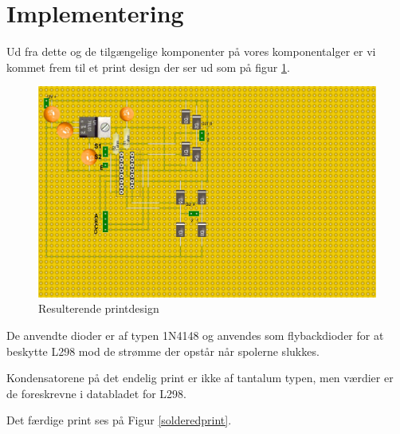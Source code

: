\section{Implementering}
Ud fra dette og de tilgængelige komponenter på vores komponentalger er vi kommet frem til et print design der ser ud som på figur \ref{printdesign}.

\begin{figure}[H]
	\centering
	\includegraphics[scale=0.25,trim=0 20 500 0, clip]{Billeder/printdesign}
	\caption{Resulterende printdesign}
	\label{printdesign}
\end{figure}

De anvendte dioder er af typen 1N4148 og anvendes som flybackdioder for at beskytte L298 mod de strømme der opstår når spolerne slukkes.

Kondensatorene på det endelig print er ikke af tantalum typen, men værdier er de foreskrevne i databladet for L298.

Det færdige print ses på Figur \ref{solderedprint}.

